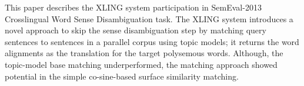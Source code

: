 This paper describes the XLING system participation in SemEval-2013 Crosslingual Word Sense Disambiguation task. The XLING system introduces a
 novel approach to skip the sense disambiguation step by matching query
 sentences to sentences in a parallel corpus using topic models; it returns the
 word alignments as the translation for the target polysemous words. Although,
 the topic-model base matching underperformed, the matching approach showed
 potential in the simple co-sine-based surface similarity matching.

